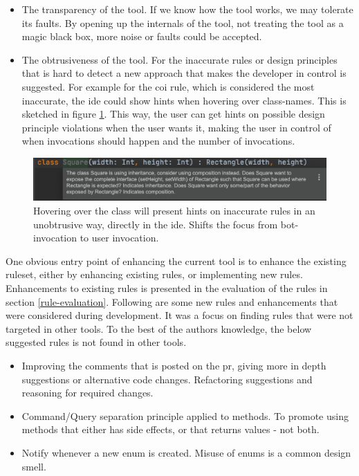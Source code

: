 \documentclass{report}
\begin{document}
\begin{itemize}
    \item The transparency of the tool. If we know how the tool works, we may tolerate its faults. By opening up the internals of the tool, not treating the tool as a magic black box, more noise or faults could be accepted.
    
    \item The obtrusiveness of the tool. For the inaccurate rules or design principles that is hard to detect a new approach that makes the developer in control is suggested. For example for the \gls{coi} rule, which is considered the most inaccurate, the \gls{ide} could show hints when hovering over class-names. This is sketched in figure \ref{fig:a-new-beginning}. This way, the user can get hints on possible design principle violations when the user wants it, making the user in control of when invocations should happen and the number of invocations.

\end{itemize}


\begin{figure}[h!]
    \centering
    \includegraphics[width=\linewidth]{report/a-new-beginning (2).png}
    \caption{Hovering over the class will present hints on inaccurate rules in an unobtrusive way, directly in the \gls{ide}. Shifts the focus from bot-invocation to user invocation.}
    \label{fig:a-new-beginning}
\end{figure}


One obvious entry point of enhancing the current tool is to enhance the existing ruleset, either by enhancing existing rules, or implementing new rules. Enhancements to existing rules is presented in the evaluation of the rules in section \ref{rule-evaluation}. Following are some new rules and enhancements that were considered during development. It was a focus on finding rules that were not targeted in other tools. To the best of the authors knowledge, the below suggested rules is not found in other tools. 

\begin{itemize}
    \item Improving the comments that is posted on the \gls{pr}, giving more in depth suggestions or alternative code changes. Refactoring suggestions and reasoning for required changes.  
    
    \item Command/Query separation principle applied to methods. To promote using methods that either has side effects, or that returns values - not both. 
    
    \item Notify whenever a new enum is created. Misuse of enums is a common design smell.
\end{itemize}
\end{document}
